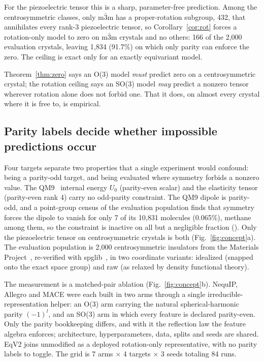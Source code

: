 For the piezoelectric tensor this is a sharp, parameter-free prediction. Among the centrosymmetric classes, only m$\bar 3$m has a proper-rotation subgroup, 432, that annihilates every rank-3 piezoelectric tensor, so Corollary~\ref{cor:rot} forces a rotation-only model to zero on m$\bar 3$m crystals and no others: 166 of the 2,000 evaluation crystals, leaving 1,834 (91.7\%) on which only parity can enforce the zero. The ceiling is exact only for an exactly equivariant model.

Theorem~\ref{thm:zero} says an O(3) model \emph{must} predict zero on a centrosymmetric crystal; the rotation ceiling says an SO(3) model \emph{may} predict a nonzero tensor wherever rotation alone does not forbid one. That it does, on almost every crystal where it is free to, is empirical.

\subsection*{Parity labels decide whether impossible predictions occur}

Four targets separate two properties that a single experiment would confound: being a parity-odd target, and being evaluated where symmetry forbids a nonzero value. The QM9~\cite{ramakrishnan2014qm9} internal energy $U_0$ (parity-even scalar) and the elasticity tensor (parity-even rank 4) carry no odd-parity constraint. The QM9 dipole is parity-odd, and a point-group census of the evaluation population finds that symmetry forces the dipole to vanish for only 7 of its 10,831 molecules (0.065\%), methane among them, so the constraint is inactive on all but a negligible fraction (). Only the piezoelectric tensor on centrosymmetric crystals is both (Fig.~\ref{fig:concept}a). The evaluation population is 2,000 centrosymmetric insulators from the Materials Project~\cite{jain2013materials}, re-verified with spglib~\cite{togo2024spglib}, in two coordinate variants: idealized (snapped onto the exact space group) and raw (as relaxed by density functional theory).

The measurement is a matched-pair ablation (Fig.~\ref{fig:concept}b). NequIP, Allegro and MACE were each built in two arms through a single irreducible-representation helper: an O(3) arm carrying the natural spherical-harmonic parity $(-1)^{l}$, and an SO(3) arm in which every feature is declared parity-even. Only the parity bookkeeping differs, and with it the reflection law the feature algebra enforces; architecture, hyperparameters, data, splits and seeds are shared. EqV2 joins unmodified as a deployed rotation-only representative, with no parity labels to toggle. The grid is 7 arms $\times$ 4 targets $\times$ 3 seeds totaling 84 runs.


